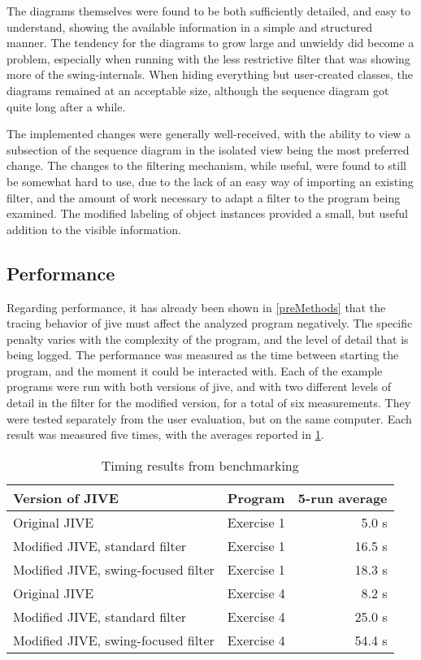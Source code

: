 The diagrams themselves were found to be both sufficiently detailed, and easy to understand, showing the available information in a simple and structured manner.
The tendency for the diagrams to grow large and unwieldy did become a problem, especially when running with the less restrictive filter that was showing more of the swing-internals.
When hiding everything but user-created classes, the diagrams remained at an acceptable size, although the sequence diagram got quite long after a while.

The implemented changes were generally well-received, with the ability to view a subsection of the sequence diagram in the isolated view being the most preferred change.
The changes to the filtering mechanism, while useful, were found to still be somewhat hard to use, due to the lack of an easy way of importing an existing filter, and the amount of work necessary to adapt a filter to the program being examined.
The modified labeling of object instances provided a small, but useful addition to the visible information.

\subsection{Performance}\label{jiveEvalPerf}
Regarding performance, it has already been shown in \cref{preMethods} that the tracing behavior of \gls{jive} must affect the analyzed program negatively.
The specific penalty varies with the complexity of the program, and the level of detail that is being logged.
The performance was measured as the time between starting the program, and the moment it could be interacted with.
Each of the example programs were run with both versions of \gls{jive}, and with two different levels of detail in the filter for the modified version, for a total of six measurements.
They were tested separately from the user evaluation, but on the same computer.
Each result was measured five times, with the averages reported in \cref{tab:testPerf}.

\begin{table}[H]
	\begin{center}
		\caption{Timing results from benchmarking}
		\label{tab:testPerf}
		\begin{tabular}{llr}
			\hline
			Version of JIVE & Program & 5-run average\\ \hline
			Original JIVE & Exercise 1 & 5.0 s\\
			Modified JIVE, standard filter & Exercise 1 & 16.5 s\\
			Modified JIVE, swing-focused filter & Exercise 1 & 18.3 s\\
			Original JIVE & Exercise 4 & 8.2 s\\ 
			Modified JIVE, standard filter & Exercise 4 & 25.0 s\\ 
			Modified JIVE, swing-focused filter & Exercise 4 & 54.4 s\\ \hline
		\end{tabular}
	\end{center}
\end{table}

